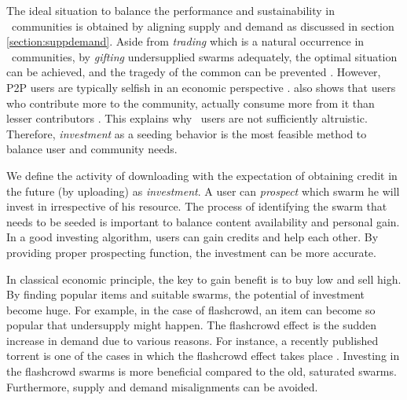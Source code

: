 The ideal situation to balance the performance and sustainability in \bt~communities is obtained by aligning supply and demand as discussed in section \ref{section:suppdemand}. Aside from \textit{trading} which is a natural occurrence in \bt~communities, by \textit{gifting} undersupplied swarms adequately, the optimal situation can be achieved, and the tragedy of the common can be prevented \cite{2002:reputationtotragedy:milinski}. However, P2P users are typically selfish in an economic perspective \cite{2014:userbehaviourprivate:jia}. \citeauthor{2009:demandsupplyres:andrade} also shows that users who contribute more to the community, actually consume more from it than lesser contributors \cite{2009:demandsupplyres:andrade}. This explains why \bt~users are not sufficiently altruistic. Therefore, \textit{investment} as a seeding behavior is the most feasible method to balance user and community needs.

We define the activity of downloading with the expectation of obtaining credit in the future (by uploading) as \textit{investment}. A user can \textit{prospect} which swarm he will invest in irrespective of his resource. The process of identifying the swarm that needs to be seeded is important to balance content availability and personal gain. In a good investing algorithm, users can gain credits and help each other. By providing proper prospecting function, the investment can be more accurate.


In classical economic principle, the key to gain benefit is to buy low and sell high. By finding popular items and suitable swarms, the potential of investment become huge. For example, in the case of flashcrowd, an item can become so popular that undersupply might happen. The flashcrowd effect is the sudden increase in demand due to various reasons. For instance, a recently published torrent is one of the cases in which the flashcrowd effect takes place \cite{2013:swarmevolution:su}. Investing in the flashcrowd swarms is more beneficial compared to the old, saturated swarms. Furthermore, supply and demand misalignments can be avoided.

